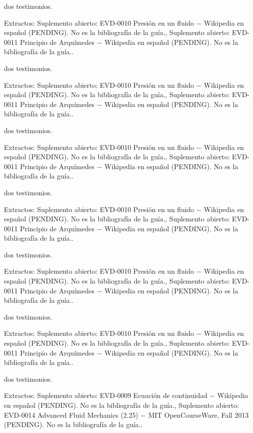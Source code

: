 \documentclass{book}
\begin{document}
\noindent dos testimonios.

\noindent Extractos: Suplemento abierto: EVD-0010 Presión en un fluido \(-\) Wikipedia en español (PENDING). No es la bibliografía de la guía., Suplemento abierto: EVD-0011 Principio de Arquímedes \(-\) Wikipedia en español (PENDING). No es la bibliografía de la guía..

\noindent dos testimonios.

\noindent Extractos: Suplemento abierto: EVD-0010 Presión en un fluido \(-\) Wikipedia en español (PENDING). No es la bibliografía de la guía., Suplemento abierto: EVD-0011 Principio de Arquímedes \(-\) Wikipedia en español (PENDING). No es la bibliografía de la guía..

\noindent dos testimonios.

\noindent Extractos: Suplemento abierto: EVD-0010 Presión en un fluido \(-\) Wikipedia en español (PENDING). No es la bibliografía de la guía., Suplemento abierto: EVD-0011 Principio de Arquímedes \(-\) Wikipedia en español (PENDING). No es la bibliografía de la guía..

\noindent dos testimonios.

\noindent Extractos: Suplemento abierto: EVD-0010 Presión en un fluido \(-\) Wikipedia en español (PENDING). No es la bibliografía de la guía., Suplemento abierto: EVD-0011 Principio de Arquímedes \(-\) Wikipedia en español (PENDING). No es la bibliografía de la guía..

\noindent dos testimonios.

\noindent Extractos: Suplemento abierto: EVD-0010 Presión en un fluido \(-\) Wikipedia en español (PENDING). No es la bibliografía de la guía., Suplemento abierto: EVD-0011 Principio de Arquímedes \(-\) Wikipedia en español (PENDING). No es la bibliografía de la guía..

\noindent dos testimonios.

\noindent Extractos: Suplemento abierto: EVD-0010 Presión en un fluido \(-\) Wikipedia en español (PENDING). No es la bibliografía de la guía., Suplemento abierto: EVD-0011 Principio de Arquímedes \(-\) Wikipedia en español (PENDING). No es la bibliografía de la guía..

\noindent dos testimonios.

\noindent Extractos: Suplemento abierto: EVD-0009 Ecuación de continuidad \(-\) Wikipedia en español (PENDING). No es la bibliografía de la guía., Suplemento abierto: EVD-0014 Advanced Fluid Mechanics (2.25) \(-\) MIT OpenCourseWare, Fall 2013 (PENDING). No es la bibliografía de la guía..
\end{document}
